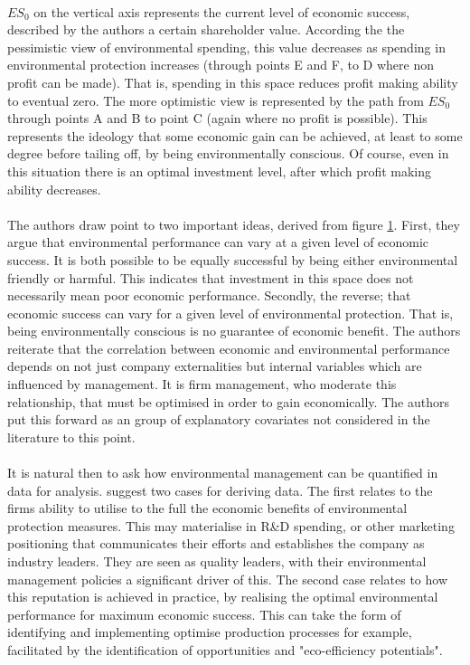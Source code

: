{\begin{figure}[h]
\label{ch3_successAndEnviornment}
\end{figure}\\
$ES_0$ on the vertical axis represents the current level of economic success, described by the authors a certain shareholder value. According the the pessimistic view of environmental spending, this value decreases as spending in environmental protection increases (through points E and F, to D where non profit can be made). That is, spending in this space reduces profit making ability to eventual zero. The more optimistic view is represented by the path from $ES_0$ through points A and B to point C (again where no profit is possible). This represents the ideology that some economic gain can be achieved, at least to some degree before tailing off, by being environmentally conscious. Of course, even in this situation there is an optimal investment level, after which profit making ability decreases. \\\\
The authors draw point to two important ideas, derived from figure \ref{ch3_successAndEnviornment}. First, they argue that environmental performance can vary at a given level of economic success. It is both possible to be equally successful by being either environmental friendly or harmful. This indicates that investment in this space does not necessarily mean poor economic performance. Secondly, the reverse; that economic success can vary for a given level of environmental protection. That is, being environmentally conscious is no guarantee of economic benefit. The authors reiterate that the correlation between economic and environmental performance depends on not just company externalities but internal variables which are influenced by management. It is firm management, who moderate this relationship, that must be optimised in order to gain economically. The authors put this forward as an group of explanatory covariates not considered in the literature to this point. \\\\
It is natural then to ask how environmental management can be quantified in data for analysis. \cite{schaltegger2002link} suggest two cases for deriving data. The first relates to the firms ability to utilise to the full the economic benefits of environmental protection measures. This may materialise in R\&D spending, or other marketing positioning that communicates their efforts and establishes the company as industry leaders. They are seen as quality leaders, with their environmental management policies a significant driver of this. The second case relates to how this reputation is achieved in practice, by realising the optimal environmental performance for maximum economic success. This can take the form of identifying and implementing optimise production processes for example, facilitated by the identification of opportunities and "eco-efficiency potentials". \\\\
}
